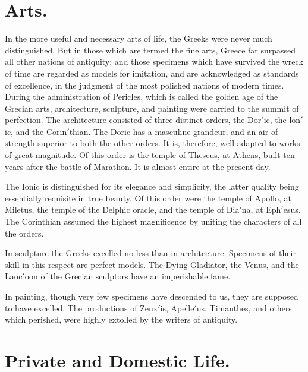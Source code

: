 \documentclass[openany,a4paper]{memoir}
\begin{document}
\section{Arts.}

In the more useful and necessary arts of life, the 
Greeks were never much distinguished. But in those which 
are termed the fine arts, Greece far surpassed all other nations 
of antiquity; and those specimens which have survived the 
wreck of time are regarded as models for imitation, and are 
acknowledged as standards of excellence, in the judgment of 
the most polished nations of modern times. During the administration of Pericles, which is called the golden age of 
the Grecian arts, architecture, sculpture, and painting were 
carried to the summit of perfection. The architecture consisted of three distinct orders, the Dor$'$ic, the lon$'$ic, and 
the Corin$'$thian. The Doric has a masculine grandeur, and 
an air of strength superior to both the other orders. It is, 
therefore, well adapted to works of great magnitude. Of 
this order is the temple of Theseus, at Athens, built ten 
years after the battle of Marathon. It is almost entire at 
the present day. 

The Ionic is distinguished for its elegance and simplicity, 
the latter quality being essentially requisite in true beauty. 
Of this order were the temple of Apollo, at Miletus, the 
temple of the Delphic oracle, and the temple of Dia$'$na, at 
Eph$'$esus. The Corinthian assumed the highest magnificence by uniting the characters of all the orders. 

In sculpture the Greeks excelled no less than in architecture. Specimens of their skill in this respect are perfect models. The Dying Gladiator, the Venus, and the 
Laoc$'$oon of the Grecian sculptors have an imperishable 
fame. 

In painting, though very few specimens have descended 
to us, they are supposed to have excelled. The productions 
of Zeux$'$is, Apelle$'$us, Timanthes, and others which perished, were highly extolled by the writers of antiquity. 

\section{Private and Domestic Life.}
\end{document}
